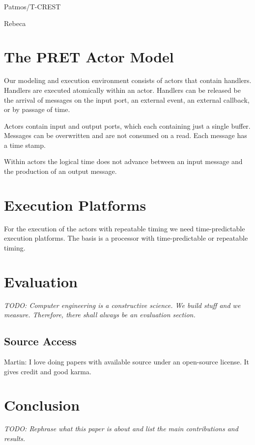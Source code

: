 \documentclass[a4paper, conference]{IEEEtran}
\newcommand{\todo}[1]{{\emph{TODO: #1}}}
\newcommand{\martin}[1]{{\color{blue} Martin: #1}}
\begin{document}
Patmos/T-CREST \cite{patmos:rts2018} \cite{t-crest:2015}

Rebeca


\section{The PRET Actor Model}
\label{sec:actor}

Our modeling and execution environment consists of actors that contain
handlers. Handlers are executed atomically within an actor.
Handlers can be released be the arrival of messages on the input
port, an external event, an external callback, or by passage of time.

Actors contain input and output ports, which each containing just a single
buffer. Messages can be overwritten and are not consumed on a read.
Each message has a time stamp.

Within actors the logical time does not advance between an input message
and the production of an output message.

\section{Execution Platforms}

For the execution of the actors with repeatable timing we need time-predictable
execution platforms. The basis is a processor with time-predictable or repeatable
timing.

\section{Evaluation}
\label{sec:eval}

\todo{Computer engineering is a constructive science. We build stuff and we measure.
Therefore, there shall always be an evaluation section.}

\subsection{Source Access}

\martin{I love doing papers with available source under an
open-source license. It gives credit and good karma.}

\section{Conclusion}
\label{sec:conclusion}

\todo{Rephrase what this paper is about and list the main contributions and results.}
\end{document}
